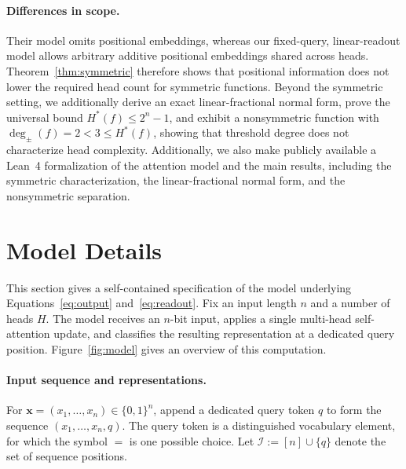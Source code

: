 \documentclass{article}
\theoremstyle{definition}
\theoremstyle{plain}
\newcommand{\hstar}{H^{\ast}}
\newcommand{\tdeg}{\deg_{\pm}}
\newcommand{\bits}{\{0,1\}}
\begin{document}
\paragraph{Differences in scope.}
Their model omits positional embeddings, whereas our fixed-query, linear-readout model allows arbitrary additive positional embeddings shared across heads. Theorem~\ref{thm:symmetric} therefore shows that positional information does not lower the required head count for symmetric functions. Beyond the symmetric setting, we additionally derive an exact linear-fractional normal form, prove the universal bound $\hstar(f)\leq 2^n-1$, and exhibit a nonsymmetric function with $\tdeg(f)=2<3\leq\hstar(f)$, showing that threshold degree does not characterize head complexity. Additionally, we also make publicly available a Lean~4 formalization of the attention model and the main results, including the symmetric characterization, the linear-fractional normal form, and the nonsymmetric separation.

\section{Model Details}
\label{app:model-details}

This section gives a self-contained specification of the model underlying Equations~\eqref{eq:output} and~\eqref{eq:readout}. Fix an input length $n$ and a number of heads $H$. The model receives an $n$-bit input, applies a single multi-head self-attention update, and classifies the resulting representation at a dedicated query position. Figure~\ref{fig:model} gives an overview of this computation.

\paragraph{Input sequence and representations.}
For $\mathbf{x}=(x_1,\ldots,x_n)\in\bits^n$, append a dedicated query token $q$ to form the sequence $(x_1,\ldots,x_n,q)$. The query token is a distinguished vocabulary element, for which the symbol $=$ is one possible choice. Let $\mathcal{I}:=[n]\cup\{q\}$ denote the set of sequence positions.
\end{document}
